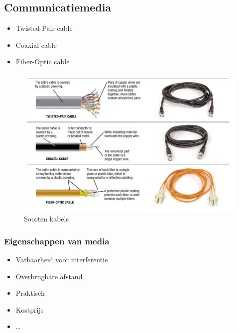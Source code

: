 \documentclass{article}
\begin{document}
\subsection{Communicatiemedia}
\begin{itemize}
    \item Twisted-Pair cable
    \item Coaxial cable
    \item Fiber-Optic cable
\end{itemize}

\begin{figure}[H]
    \centering
    \includegraphics[width=\textwidth]{Screenshot_20200315_105647.png}
    \caption{Soorten kabels}
\end{figure}


\subsubsection{Eigenschappen van media}
\begin{itemize}
    \item Vatbaarheid voor interferentie
    \item Overbrugbare afstand
    \item Praktisch
    \item Kostprijs
    \item \dots
\end{itemize}
\end{document}
